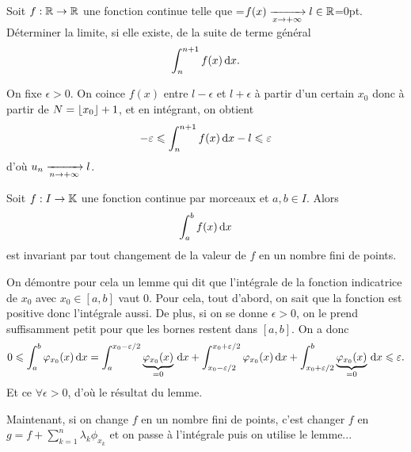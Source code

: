 \documentclass{magnolia}
\begin{document}
\begin{exos}
\exo[utile=2] Soit $f:\mathbb{R}\to\mathbb{R}$ une fonction continue telle que
  =\hbox{$f(x)\xrightarrow[x\rightarrow +\infty]{} l\in\mathbb{R}$}=0pt. Déterminer la limite, si elle existe, de la suite de terme général
  \[\int_{n}^{n+1} f(x)\,\text{d}x.\]
  \begin{sol}
  On fixe $\epsilon>0$. On coince $f(x)$ entre $l-\epsilon$ et $l+\epsilon$ à partir d'un certain $x_0$ donc à partir de $N=\left\lfloor x_0\right\rfloor+1$, et en intégrant, on obtient $$-\varepsilon\leqslant \int_{n}^{n+1} f(x)\,\text{d}x-l\leqslant \varepsilon$$ d'où $u_n\xrightarrow[n\rightarrow +\infty]{}l$.
  \end{sol}
\end{exos}

\begin{proposition}[utile=-3]
Soit $f:I\to\mathbb{K}$ une fonction continue par morceaux et $a,b\in I$. Alors
\[\int_{a}^{b} f(x)\,\text{d}x\]
est invariant par tout changement de la valeur de $f$ en un nombre fini de points.
\end{proposition}

\begin{preuve}
On démontre pour cela un lemme qui dit que l'intégrale de la fonction indicatrice de $x_0$ avec $x_0\in [a,b]$ vaut $0$. Pour cela, tout d'abord, on sait que la fonction est positive donc l'intégrale aussi. De plus, si on se donne $\epsilon>0$, on le prend suffisamment petit pour que les bornes restent dans $[a,b]$. On a donc $$0\leqslant \int_{a}^{b} \varphi_{x_0}(x)\,\text{d}x=\int_{a}^{x_0-\varepsilon/2} \underbrace{\varphi_{x_0}(x)}_{=0}\,\text{d}x+\int_{x_0-\varepsilon/2}^{x_0+\varepsilon/2} \varphi_{x_0}(x)\,\text{d}x+\int_{x_0+\varepsilon/2}^{b} \underbrace{\varphi_{x_0}(x)}_{=0}\,\text{d}x\leqslant \varepsilon.$$ Et ce $\forall \epsilon>0$, d'où le résultat du lemme.

Maintenant, si on change $f$ en un nombre fini de points, c'est changer $f$ en $g=f+\sum_{k=1}^n\lambda_k\phi_{x_k}$ et on passe à l'intégrale puis on utilise le lemme...
\end{preuve}
\end{document}
